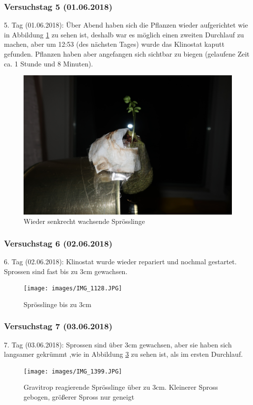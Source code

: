 \documentclass[
11pt, 
ngerman,
listof=totocnumbered,
oneside,
bibliography=totocnumbered,
abstracton
]{scrreprt}
\begin{document}
\subsubsection{Versuchstag 5 (01.06.2018)} 

5. Tag (01.06.2018): Über Abend haben sich die Pflanzen wieder aufgerichtet wie in Abbildung \ref{Foto 3} zu sehen ist, deshalb war es möglich einen zweiten Durchlauf zu machen, aber um 12:53 (des nächsten Tages) wurde das Klinostat kaputt gefunden. Pflanzen haben aber angefangen sich sichtbar zu biegen (gelaufene Zeit ca. 1 Stunde und 8 Minuten).

\begin{figure}[H]
	\centering 
	\includegraphics[width = .5\linewidth]{images/IMG_1114.JPG}
	\caption{Wieder senkrecht wachsende Sprösslinge \label{Foto 3}}
\end{figure}

\subsubsection{Versuchstag 6 (02.06.2018)} 

6. Tag (02.06.2018): Klinostat wurde wieder repariert und nochmal gestartet. Sprossen sind fast bis zu 3cm gewachsen.

\begin{figure}[H]
	\centering 
	\texttt{[image: images/IMG\_1128.JPG]}
	\caption{Sprösslinge bis zu 3cm \label{Foto 4}}
\end{figure}

\subsubsection{Versuchstag 7 (03.06.2018)} 

7. Tag (03.06.2018): Sprossen sind über 3cm gewachsen, aber sie haben sich langsamer gekrümmt ,wie in Abbildung \ref{Foto 5} zu sehen ist, als im ersten Durchlauf.

\begin{figure}[H]
	\centering 
	\texttt{[image: images/IMG\_1399.JPG]}
	\caption{Gravitrop reagierende Sprösslinge über zu 3cm. Kleinerer Spross gebogen, größerer Spross nur geneigt \label{Foto 5}}
\end{figure} 
\end{document}
